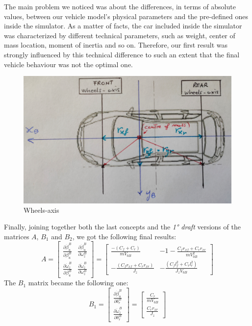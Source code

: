 The main problem we noticed was about the differences, in terms of absolute values, between our vehicle model's physical parameters and the pre-defined ones inside the simulator. As a matter of facts, the car included inside the simulator was characterized by different technical parameters, such as weight, center of mass location, moment of inertia and so on. Therefore, our first result was strongly influenced by this technical difference to such an extent that the final vehicle behaviour was not the optimal one.
\begin{figure}[b] \label{VehicleScheme}
	\centering
	\includegraphics[scale=0.065]{../Images/LinSyst/SchemaAssi}
	\caption{Wheels-axis}
\end{figure}
Finally, joining together both the last concepts and the \textit{1° draft} versions of the matrices $A$, $B_{1}$ and $B_{2}$, we got the following final results:
\begin{equation}
	A=
	\begin{bmatrix}
		\frac{\partial\dot{\beta}_{u}^{B}}{\partial\beta_{u}^{B}} & \frac{\partial\dot{\beta}_{u}^{B}}{\partial\omega_{z}^{B}} \\
		\frac{\partial\dot{\omega}_{z}^{B}}{\partial\beta_{u}^{B}} & \frac{\partial\dot{\omega}_{z}^{B}}{\partial\omega_{z}^{B}}
	\end{bmatrix} = 
	\begin{bmatrix}
		\frac{-(C_{f} + C_{r})}{mV_{0B}} & -1 -\frac{C_{f}r_{xf} + C_{r}r_{xr}}{m V_{0B}^{2}} \\ 
		-\frac{(C_{f}r_{xf} + C_{r}r_{xr})}{J_{z}} & -\frac{(C_{f}l_{f}^{2} + C_{r}l_{r}^{2})}{J_{z} V_{0B}}
	\end{bmatrix}
\end{equation}
The $B_{1}$ matrix became the following one:
\begin{equation} 
B_{1}=
\begin{bmatrix} 
\frac{\partial\dot{\beta}_{u}^{B}}{\partial\delta_{r}^{B}} \\
\frac{\partial\dot{\omega}_{z}^{B}}{\partial\delta_{r}^{B}}
\end{bmatrix} =
\begin{bmatrix} 
\frac{C_{r}}{m V_{0B}} \\ \frac{C_{r}r_{xr}}{J_{z}}
\end{bmatrix} 
\end{equation}
